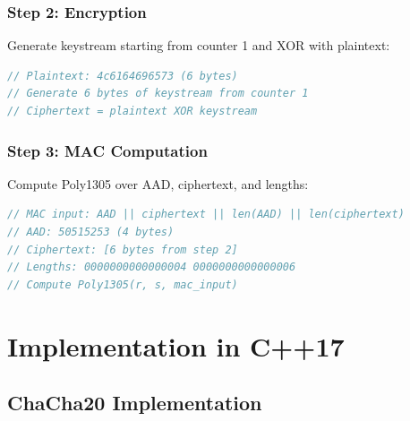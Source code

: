 \documentclass[11pt,a4paper]{article}
\begin{document}
\subsubsection{Step 2: Encryption}

Generate keystream starting from counter 1 and XOR with plaintext:
\begin{lstlisting}[language=C++, caption=Encryption]
// Plaintext: 4c6164696573 (6 bytes)
// Generate 6 bytes of keystream from counter 1
// Ciphertext = plaintext XOR keystream
\end{lstlisting}

\subsubsection{Step 3: MAC Computation}

Compute Poly1305 over AAD, ciphertext, and lengths:
\begin{lstlisting}[language=C++, caption=MAC Computation]
// MAC input: AAD || ciphertext || len(AAD) || len(ciphertext)
// AAD: 50515253 (4 bytes)
// Ciphertext: [6 bytes from step 2]
// Lengths: 0000000000000004 0000000000000006
// Compute Poly1305(r, s, mac_input)
\end{lstlisting}

\section{Implementation in C++17}

\subsection{ChaCha20 Implementation}
\end{document}
